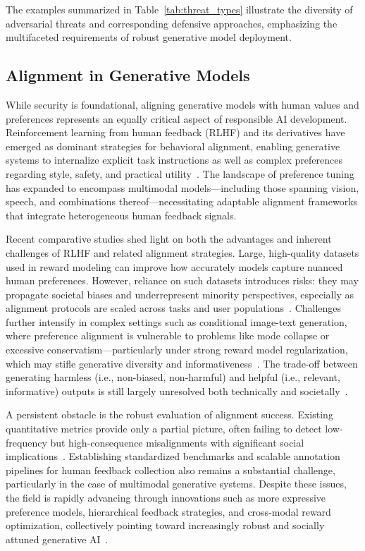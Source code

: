\documentclass[sigconf]{acmart}
\begin{document}
The examples summarized in Table~\ref{tab:threat_types} illustrate the diversity of adversarial threats and corresponding defensive approaches, emphasizing the multifaceted requirements of robust generative model deployment.

\subsection{Alignment in Generative Models}

While security is foundational, aligning generative models with human values and preferences represents an equally critical aspect of responsible AI development. Reinforcement learning from human feedback (RLHF) and its derivatives have emerged as dominant strategies for behavioral alignment, enabling generative systems to internalize explicit task instructions as well as complex preferences regarding style, safety, and practical utility~\cite{ref69,ref75}. The landscape of preference tuning has expanded to encompass multimodal models—including those spanning vision, speech, and combinations thereof—necessitating adaptable alignment frameworks that integrate heterogeneous human feedback signals.

Recent comparative studies shed light on both the advantages and inherent challenges of RLHF and related alignment strategies. Large, high-quality datasets used in reward modeling can improve how accurately models capture nuanced human preferences. However, reliance on such datasets introduces risks: they may propagate societal biases and underrepresent minority perspectives, especially as alignment protocols are scaled across tasks and user populations~\cite{ref69}. Challenges further intensify in complex settings such as conditional image-text generation, where preference alignment is vulnerable to problems like mode collapse or excessive conservatism—particularly under strong reward model regularization, which may stifle generative diversity and informativeness~\cite{ref75}. The trade-off between generating harmless (i.e., non-biased, non-harmful) and helpful (i.e., relevant, informative) outputs is still largely unresolved both technically and societally~\cite{ref75}.

A persistent obstacle is the robust evaluation of alignment success. Existing quantitative metrics provide only a partial picture, often failing to detect low-frequency but high-consequence misalignments with significant social implications~\cite{ref75}. Establishing standardized benchmarks and scalable annotation pipelines for human feedback collection also remains a substantial challenge, particularly in the case of multimodal generative systems. Despite these issues, the field is rapidly advancing through innovations such as more expressive preference models, hierarchical feedback strategies, and cross-modal reward optimization, collectively pointing toward increasingly robust and socially attuned generative AI~\cite{ref69,ref75}.
\end{document}

